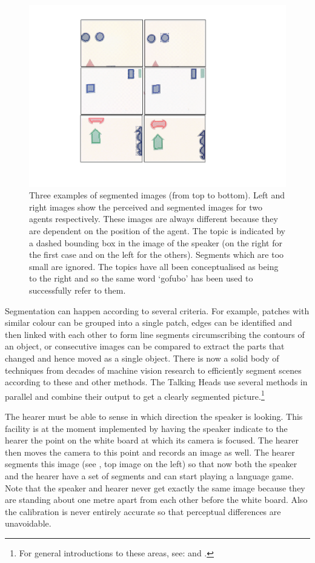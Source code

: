 \begin{figure}[htbp]
  \centerline{\includegraphics[width=.60\textwidth]{chap2/figs/hpos.pdf}}
\caption{Three examples of segmented images (from top to bottom). Left and right images 
show the perceived and segmented images for two agents respectively. These images are always
different because they are dependent on the position of the agent. 
The topic is indicated by a dashed bounding box in the 
image of the speaker (on the right for the first case and on the left for the others). 
Segments which are too small are ignored. The topics have all been conceptualised
as being to the right and so the same word 
`gofubo' has been used to successfully refer to them.}
\label{f:plate10}
\end{figure}

Segmentation can happen according to several criteria. 
For example, patches with similar colour can be grouped 
into a single patch, edges can be identified 
and then linked with each other to form line segments
circumscribing the contours of 
an object, or consecutive images can be compared to extract the parts
that changed and hence moved as a single object. 
There is now a solid body of techniques from decades
of machine vision research to efficiently segment scenes according to 
these and other methods. The Talking Heads use several methods
in parallel and combine their output to get a clearly segmented
picture.\footnote{
For general introductions to these areas, 
see: \cite{Ballard:1982} and \cite{Fischler:1987}.}

The hearer must be able to sense in which direction the speaker is looking. 
This facility is at the moment implemented by having 
the speaker indicate to the hearer the point on the white board 
at which its camera is focused. The hearer then moves the camera
to this point and records an image as well. The hearer segments 
this image (see , top image on the left) so that 
now both the speaker 
and the hearer have a set of segments and can start playing 
a language game. Note that the speaker and hearer never get 
exactly the same image because they are standing about one 
metre apart from each other before the white board. Also the
calibration is never entirely accurate so that perceptual 
differences are unavoidable.

